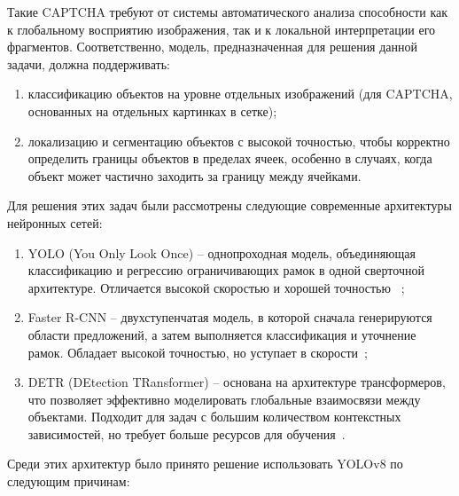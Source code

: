 Такие CAPTCHA требуют от системы автоматического анализа способности как к 
глобальному восприятию изображения, так и к локальной интерпретации его 
фрагментов. Соответственно, модель, предназначенная для решения данной задачи, 
должна поддерживать:

\begin{enumerate}
    \item классификацию объектов на уровне отдельных изображений (для CAPTCHA, 
    основанных на отдельных картинках в сетке);
    \item локализацию и сегментацию объектов с высокой точностью, чтобы 
    корректно определить границы объектов в пределах ячеек, особенно в случаях, 
    когда объект может частично заходить за границу между ячейками.
\end{enumerate}

Для решения этих задач были рассмотрены следующие современные архитектуры 
нейронных сетей:

\begin{enumerate}
    \item YOLO (You Only Look Once) -- однопроходная модель, объединяющая 
    классификацию и регрессию ограничивающих рамок в одной сверточной 
    архитектуре. Отличается высокой скоростью и хорошей точностью~
    \cite{redmon2016yolov2, UltralyticsYOLOv8};
    \item Faster R-CNN -- двухступенчатая модель, в которой сначала генерируются 
    области предложений, а затем выполняется классификация и уточнение рамок. 
    Обладает высокой точностью, но уступает в скорости~\cite{ren2015fasterrcnn};
    \item DETR (DEtection TRansformer) -- основана на архитектуре трансформеров, 
    что позволяет эффективно моделировать глобальные взаимосвязи между объектами. 
    Подходит для задач с большим количеством контекстных зависимостей, но требует 
    больше ресурсов для обучения~\cite{carion2020detr}.
\end{enumerate}

Среди этих архитектур было принято решение использовать YOLOv8 по следующим 
причинам:


